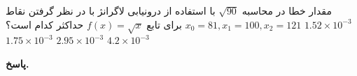 مقدار خطا در محاسبه  
\(\sqrt{90}\)
با استفاده از درونیابی لاگرانژ با در نظر گرفتن نقاط 
\(x_0= 81,  x_1=100, x_2=121\)
برای تابع
\(f(x) = \sqrt{x}\)
حداکثر کدام است؟
\mulchoice
	{\(1.52 \times 10^{-3}\)}
	{\(1.75 \times 10^{-3}\)}
	{\(2.95\times 10^{-3}\)}
	{\(4.2 \times 10^{-3}\)}

\begin{answer}

	\textbf{پاسخ.}
	
\end{answer}
